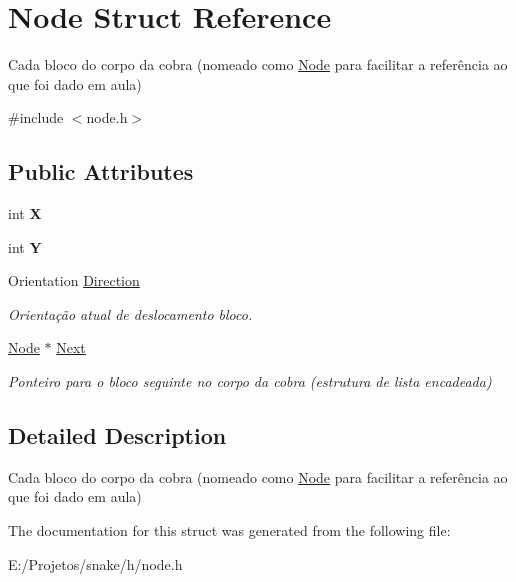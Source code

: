 \hypertarget{struct_node}{}\section{Node Struct Reference}
\label{struct_node}


Cada bloco do corpo da cobra (nomeado como \hyperlink{struct_node}{Node} para facilitar a referência ao que foi dado em aula)  




{\ttfamily \#include $<$node.\+h$>$}

\subsection*{Public Attributes}
\begin{DoxyCompactItemize}
\item 
\hypertarget{struct_node_a68b528083eb83efbeba1cad098d6f61d}{}int {\bfseries X}\label{struct_node_a68b528083eb83efbeba1cad098d6f61d}

\item 
\hypertarget{struct_node_a21f98f260ae18f2bb68d4d56ecd8366b}{}int {\bfseries Y}\label{struct_node_a21f98f260ae18f2bb68d4d56ecd8366b}

\item 
\hypertarget{struct_node_a00be53a29f8c6c0d37107c2289ac0108}{}Orientation \hyperlink{struct_node_a00be53a29f8c6c0d37107c2289ac0108}{Direction}\label{struct_node_a00be53a29f8c6c0d37107c2289ac0108}

\begin{DoxyCompactList}\small\item\em Orientação atual de deslocamento bloco. \end{DoxyCompactList}\item 
\hypertarget{struct_node_a7cf66a5bbeedf3405b2931e57b273307}{}\hyperlink{struct_node}{Node} $\ast$ \hyperlink{struct_node_a7cf66a5bbeedf3405b2931e57b273307}{Next}\label{struct_node_a7cf66a5bbeedf3405b2931e57b273307}

\begin{DoxyCompactList}\small\item\em Ponteiro para o bloco seguinte no corpo da cobra (estrutura de lista encadeada) \end{DoxyCompactList}\end{DoxyCompactItemize}


\subsection{Detailed Description}
Cada bloco do corpo da cobra (nomeado como \hyperlink{struct_node}{Node} para facilitar a referência ao que foi dado em aula) 

The documentation for this struct was generated from the following file\+:\begin{DoxyCompactItemize}
\item 
E\+:/\+Projetos/snake/h/node.\+h\end{DoxyCompactItemize}
